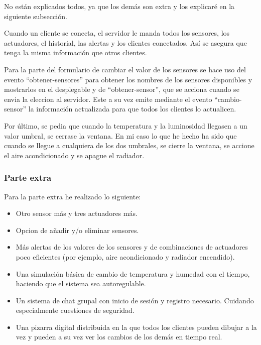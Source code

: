 \documentclass{article}
\begin{document}
No están explicados todos, ya que los demás son extra y los explicaré en la siguiente subsección.

Cuando un cliente se conecta, el servidor le manda todos los sensores, los actuadores, el historial, las alertas y los clientes conectados. Así se asegura que tenga la misma información que otros clientes.


Para la parte del formulario de cambiar el valor de los sensores se hace uso del evento ``obtener-sensores'' para obtener los nombres de los sensores disponibles y mostrarlos en el desplegable y de ``obtener-sensor'', que se acciona cuando se envia la eleccion al servidor. Este a su vez emite mediante el evento ``cambio-sensor'' la información actualizada para que todos los clientes lo actualicen.

Por último, se pedia que cuando la temperatura y la luminosidad llegasen a un valor umbral, se cerrase la ventana. En mi caso lo que he hecho ha sido que cuando se llegue a cualquiera de los dos umbrales, se cierre la ventana, se accione el aire acondicionado y se apague el radiador.


\subsubsection{Parte extra}
Para la parte extra he realizado lo siguiente:

\begin{itemize}
    \item Otro sensor más y tres actuadores más.
    \item Opcion de añadir y/o eliminar sensores.
    \item Más alertas de los valores de los sensores y de combinaciones de actuadores poco eficientes (por ejemplo, aire acondicionado y radiador encendido).
    \item Una simulación básica de cambio de temperatura y humedad con el tiempo, haciendo que el sistema sea autoregulable.
    \item Un sistema de chat grupal con inicio de sesión y registro necesario. Cuidando especialmente cuestiones de seguridad.
    \item Una pizarra digital distribuida en la que todos los clientes pueden dibujar a la vez y pueden a su vez ver los cambios de los demás en tiempo real.
\end{itemize}
\end{document}
